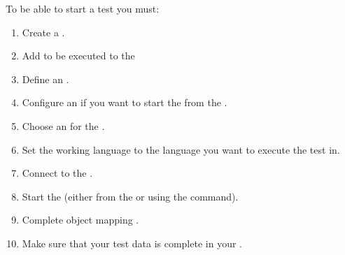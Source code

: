 % 
%
%
To be able to start a test you must:

\begin{enumerate}
\item Create a \gdsuite{} .
\item Add \gdcases{} to be executed to the \gdsuite{} 
\item Define an \gdaut{} .
\item Configure an \gdaut{}  if you want to start the \gdaut{} from the \ite{}.  
\item Choose an \gdaut{} for the \gdsuite{} .
\item Set the working language to the language you want to execute the test in.
\item Connect to the \gdagent{} .
\item Start the \gdaut{}  (either from the \ite{} or using the  command). 
\item Complete object mapping .
\item Make sure that your test data is complete in your \gdcases{}.
\end{enumerate}







